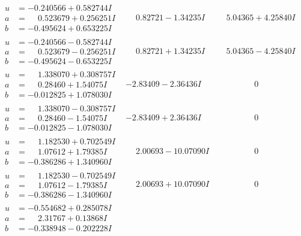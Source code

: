 \documentclass[1p]{elsarticle_modified}
\theoremstyle{definition}
\begin{document}
$$\begin{array}{c|c|c}
\begin{aligned}
u &= -0.240566 + 0.582744 I \\
a &= \phantom{-}0.523679 + 0.256251 I \\
b &= -0.495624 + 0.653225 I\end{aligned}
 & \phantom{-}0.82721 - 1.34235 I & \phantom{-}5.04365 + 4.25840 I \\ \hline\begin{aligned}
u &= -0.240566 - 0.582744 I \\
a &= \phantom{-}0.523679 - 0.256251 I \\
b &= -0.495624 - 0.653225 I\end{aligned}
 & \phantom{-}0.82721 + 1.34235 I & \phantom{-}5.04365 - 4.25840 I \\ \hline\begin{aligned}
u &= \phantom{-}1.338070 + 0.308757 I \\
a &= \phantom{-}0.28460 + 1.54075 I \\
b &= -0.012825 + 1.078030 I\end{aligned}
 & -2.83409 - 2.36436 I & \phantom{-0.000000 } 0 \\ \hline\begin{aligned}
u &= \phantom{-}1.338070 - 0.308757 I \\
a &= \phantom{-}0.28460 - 1.54075 I \\
b &= -0.012825 - 1.078030 I\end{aligned}
 & -2.83409 + 2.36436 I & \phantom{-0.000000 } 0 \\ \hline\begin{aligned}
u &= \phantom{-}1.182530 + 0.702549 I \\
a &= \phantom{-}1.07612 + 1.79385 I \\
b &= -0.386286 + 1.340960 I\end{aligned}
 & \phantom{-}2.00693 - 10.07090 I & \phantom{-0.000000 } 0 \\ \hline\begin{aligned}
u &= \phantom{-}1.182530 - 0.702549 I \\
a &= \phantom{-}1.07612 - 1.79385 I \\
b &= -0.386286 - 1.340960 I\end{aligned}
 & \phantom{-}2.00693 + 10.07090 I & \phantom{-0.000000 } 0 \\ \hline\begin{aligned}
u &= -0.554682 + 0.285078 I \\
a &= \phantom{-}2.31767 + 0.13868 I \\
b &= -0.338948 - 0.202228 I\end{aligned}

\end{array}$$
\end{document}
